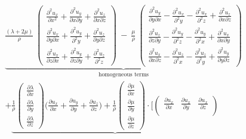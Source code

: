 \documentclass{article} %
\providecommand{\DIFdelend}{} %
\DeclareRobustCommand{\DIFdelend}{\DIFOaddend \let\includegraphics\DIFOincludegraphics} %
\begin{document}
\DIFdelend \begin{align}
		\underbrace{\frac{(\lambda + 2\mu)}{\rho} \: 
			\begin{pmatrix}
				\frac{\partial^{2}u_{x}}{\partial x^{2}} +  \frac{\partial^{2}u_{y}}{\partial x \partial y} + \frac{\partial^{2}u_{z}}{\partial x \partial z} \\
				\frac{\partial^{2}u_{x}}{\partial y \partial x} +  \frac{\partial^{2}u_{y}}{\partial^{2} y } + \frac{\partial^{2}u_{z}}{\partial y \partial z}   \\
				\frac{\partial^{2}u_{x}}{\partial z \partial x} +  \frac{\partial^{2}u_{y}}{\partial z \partial y} + \frac{\partial^{2}u_{z}}{\partial^{2} z} 
			\end{pmatrix} 
			\: - \: \frac{\mu}{\rho} \:
			\begin{pmatrix}
				\frac{\partial^{2}u_{y}}{\partial y \partial x} -  \frac{\partial^{2}u_{x}}{\partial^{2} y } -  \frac{\partial^{2}u_{x}}{\partial^{2} z} + \frac{\partial^{2}u_{z}}{\partial x \partial z} \\
				\frac{\partial^{2}u_{z}}{\partial z \partial y} -  \frac{\partial^{2}u_{y}}{\partial^{2} z } -  \frac{\partial^{2}u_{y}}{\partial^{2} x} + \frac{\partial^{2}u_{x}}{\partial x \partial y}   \\
				\frac{\partial^{2}u_{x}}{\partial x \partial z} -  \frac{\partial^{2}u_{z}}{\partial^{2} x } -  \frac{\partial^{2}u_{z}}{\partial^{2} y} + \frac{\partial^{2}u_{y}}{\partial y \partial z}
		\end{pmatrix}}_\text{homogeneous terms} \\ \nonumber
		+ \underbrace{\frac{1}{\rho}
			\begin{pmatrix}
				\frac{\partial \lambda}{\partial x}\\
				\frac{\partial \lambda}{\partial y}\\
				\frac{\partial \lambda}{\partial z}
			\end{pmatrix}
			\Big(\frac{\partial u_{x}}{\partial x} + \frac{\partial u_{y}}{\partial y} +\frac{\partial u_{z}}{\partial z}\Big) + \frac{1}{\rho} 
			\begin{pmatrix}
				\frac{\partial \mu}{\partial x}\\
				\frac{\partial \mu}{\partial y}\\
				\frac{\partial \mu}{\partial z}
			\end{pmatrix}
			\cdot  \Bigg[
			\begin{pmatrix}
				\frac{\partial u_{x}}{\partial x} & \frac{\partial u_{x}}{\partial y} & \frac{\partial u_{x}}{\partial z}\\

\end{pmatrix}}
\end{align}
\end{document}
